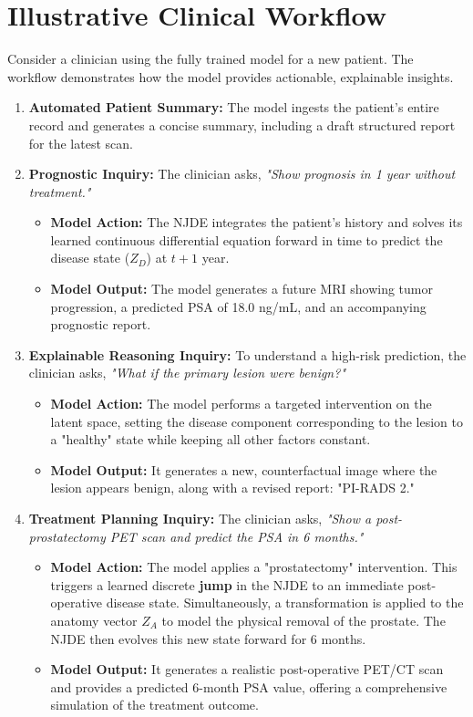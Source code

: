 \documentclass[11pt, a4paper]{article}
\begin{document}
\section{Illustrative Clinical Workflow}
Consider a clinician using the fully trained model for a new patient. The workflow demonstrates how the model provides actionable, explainable insights.
\begin{enumerate}
    \item \textbf{Automated Patient Summary:} The model ingests the patient's entire record and generates a concise summary, including a draft structured report for the latest scan.
    \item \textbf{Prognostic Inquiry:} The clinician asks, \textit{"Show prognosis in 1 year without treatment."}
    \begin{itemize}
        \item \textbf{Model Action:} The NJDE integrates the patient's history and solves its learned continuous differential equation forward in time to predict the disease state ($Z_D$) at $t+1$ year.
        \item \textbf{Model Output:} The model generates a future MRI showing tumor progression, a predicted PSA of 18.0 ng/mL, and an accompanying prognostic report.
    \end{itemize}
    \item \textbf{Explainable Reasoning Inquiry:} To understand a high-risk prediction, the clinician asks, \textit{"What if the primary lesion were benign?"}
    \begin{itemize}
        \item \textbf{Model Action:} The model performs a targeted intervention on the latent space, setting the disease component corresponding to the lesion to a "healthy" state while keeping all other factors constant.
        \item \textbf{Model Output:} It generates a new, counterfactual image where the lesion appears benign, along with a revised report: "PI-RADS 2."
    \end{itemize}
    \item \textbf{Treatment Planning Inquiry:} The clinician asks, \textit{"Show a post-prostatectomy PET scan and predict the PSA in 6 months."}
    \begin{itemize}
        \item \textbf{Model Action:} The model applies a "prostatectomy" intervention. This triggers a learned discrete \textbf{jump} in the NJDE to an immediate post-operative disease state. Simultaneously, a transformation is applied to the anatomy vector $Z_A$ to model the physical removal of the prostate. The NJDE then evolves this new state forward for 6 months.
        \item \textbf{Model Output:} It generates a realistic post-operative PET/CT scan and provides a predicted 6-month PSA value, offering a comprehensive simulation of the treatment outcome.
    \end{itemize}
\end{enumerate}
\end{document}
